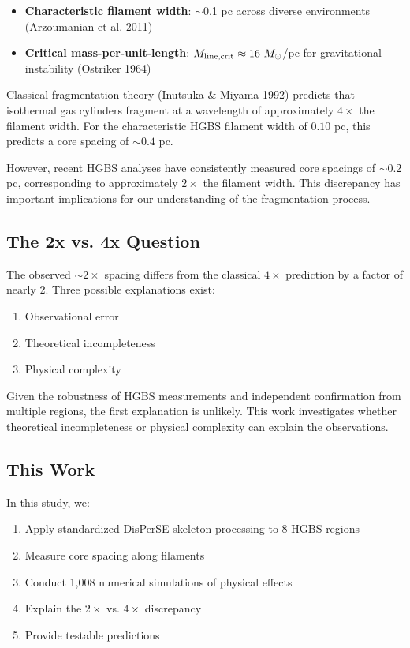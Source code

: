 \documentclass[11pt,a4paper]{article}
\begin{document}
\begin{itemize}
    \item \textbf{Characteristic filament width}: $\sim$0.1 pc across diverse environments (Arzoumanian et al. 2011)
    \item \textbf{Critical mass-per-unit-length}: $M_{\rm line,crit} \approx 16~M_\odot$/pc for gravitational instability (Ostriker 1964)
\end{itemize}

Classical fragmentation theory (Inutsuka \& Miyama 1992) predicts that isothermal gas cylinders fragment at a wavelength of approximately $4\times$ the filament width. For the characteristic HGBS filament width of $0.10$ pc, this predicts a core spacing of $\sim0.4$ pc.

However, recent HGBS analyses have consistently measured core spacings of $\sim0.2$ pc, corresponding to approximately $2\times$ the filament width. This discrepancy has important implications for our understanding of the fragmentation process.

\subsection{The 2x vs. 4x Question}

The observed $\sim2\times$ spacing differs from the classical $4\times$ prediction by a factor of nearly 2. Three possible explanations exist:

\begin{enumerate}
    \item Observational error
    \item Theoretical incompleteness
    \item Physical complexity
\end{enumerate}

Given the robustness of HGBS measurements and independent confirmation from multiple regions, the first explanation is unlikely. This work investigates whether theoretical incompleteness or physical complexity can explain the observations.

\subsection{This Work}

In this study, we:
\begin{enumerate}
    \item Apply standardized DisPerSE skeleton processing to 8 HGBS regions
    \item Measure core spacing along filaments
    \item Conduct 1,008 numerical simulations of physical effects
    \item Explain the $2\times$ vs. $4\times$ discrepancy
    \item Provide testable predictions
\end{enumerate}
\end{document}
